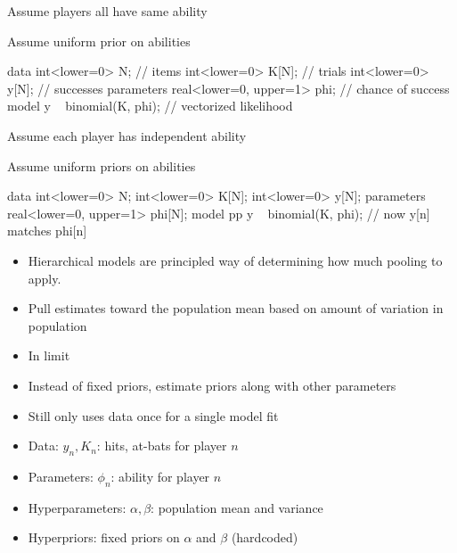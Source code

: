 \documentclass[10pt]{report}
\begin{document}
%
\begin{subitemize}
\item Assume players all have same ability
\item Assume uniform prior on abilities
\begin{stancode}
data {
  int<lower=0> N;              // items
  int<lower=0> K[N];           // trials
  int<lower=0> y[N];           // successes
}
parameters {
  real<lower=0, upper=1> phi;  // chance of success
}
model {
  y ~ binomial(K, phi);        // vectorized likelihood
}
\end{stancode}
\end{subitemize}


%
\begin{subitemize}
\item Assume each player has independent ability
\item Assume uniform priors on abilities
\begin{stancode}
data {
  int<lower=0> N;
  int<lower=0> K[N];
  int<lower=0> y[N];
}
parameters {
  real<lower=0, upper=1> phi[N];
}
model {pp
  y ~ binomial(K, phi);  // now y[n] matches phi[n]
}
\end{stancode}
\end{subitemize}


%
\begin{itemize}
\item Hierarchical models are principled way of determining how much
  pooling to apply.
\item Pull estimates toward the population mean based on amount of
  variation in population
\item In limit
\end{itemize}


%
\begin{itemize}
\item Instead of fixed priors, estimate priors along with other parameters
\item Still only uses data once for a single model fit
\item Data: $y_n, K_n$: hits, at-bats for player $n$
\item Parameters: $\phi_n$: ability for player $n$
\item Hyperparameters: $\alpha, \beta$: population mean and variance
\item Hyperpriors: fixed priors on $\alpha$ and $\beta$ (hardcoded)
\end{itemize}
\end{document}
